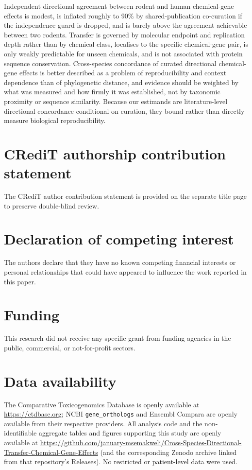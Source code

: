 \documentclass[review,12pt,authoryear]{elsarticle}
\begin{document}
Independent directional agreement between rodent and human chemical-gene effects
is modest, is inflated roughly to 90\% by shared-publication co-curation if the
independence guard is dropped, and is barely above the agreement achievable
between two rodents. Transfer is governed by molecular endpoint and replication
depth rather than by chemical class, localises to the specific chemical-gene
pair, is only weakly predictable for unseen chemicals, and is not associated with
protein sequence conservation. Cross-species concordance of curated directional
chemical-gene effects is better described as a problem of reproducibility and
context dependence than of phylogenetic distance, and evidence should be weighted
by what was measured and how firmly it was established, not by taxonomic
proximity or sequence similarity. Because our estimands are literature-level
directional concordance conditional on curation, they bound rather than directly
measure biological reproducibility.

\section*{CRediT authorship contribution statement}

The CRediT author contribution statement is provided on the separate title page
to preserve double-blind review.

\section*{Declaration of competing interest}
The authors declare that they have no known competing financial interests or
personal relationships that could have appeared to influence the work reported
in this paper.

\section*{Funding}
This research did not receive any specific grant from funding agencies in the
public, commercial, or not-for-profit sectors.

\section*{Data availability}
The Comparative Toxicogenomics Database is openly available at
\url{https://ctdbase.org}; NCBI \texttt{gene\_orthologs} and Ensembl Compara are
openly available from their respective providers. All analysis code and the
non-identifiable aggregate tables and figures supporting this study are openly
available at
\url{https://github.com/january-msemakweli/Cross-Species-Directional-Transfer-Chemical-Gene-Effects}
(and the corresponding Zenodo archive linked from that repository's Releases).
No restricted or patient-level data were used.
\end{document}

